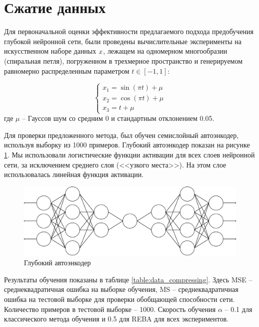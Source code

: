 \section{Сжатие данных}

Для первоначальной оценки эффективности предлагаемого подхода предобучения глубокой нейронной сети, были проведены вычислительные эксперименты на искусственном наборе данных $\boldmath{x}$, лежащем на одномерном многообразии (спиральная петля), погруженном в трехмерное пространство \cite{n11} и генерируемом равномерно распределенным параметром $t \in [-1, 1]$:

\begin{equation*}
	\begin{cases}
		x_1=\sin(\pi t) + \mu\\
		x_2=\cos(\pi t) + \mu\\
		x_3=t + \mu
	\end{cases}
\end{equation*}
где $\mu$ -- Гауссов шум со средним 0 и стандартным отклонением 0.05.

Для проверки предложенного метода, был обучен семислойный автоэнкодер, используя выборку из 1000 примеров. Глубокий автоэнкодер показан на рисунке \ref{fig:autoencoder}. Мы использовали логистические функции активации для всех слоев нейронной сети, за исключением среднего слоя (<<узкого места>>). На этом слое использовалась линейная функция активации.

\begin{figure}[ht]
	\centering
	\includegraphics[width=16cm]{man-source/images/ch3/pic3-5.pdf}
	\caption{Глубокий автоэнкодер}
	\label{fig:autoencoder}
\end{figure}

Результаты обучения показаны в таблице \ref{table:data_compressing}. Здесь MSE -- среднеквадратичная ошибка на выборке обучения, MS -- среднеквадратичная ошибка на тестовой выборке для проверки обобщающей способности сети. Количество примеров в тестовой выборке -- 1000. Скорость обучения $\alpha$ -- 0.1 для классического метода обучения и 0.5 для REBA для всех экспериментов.


